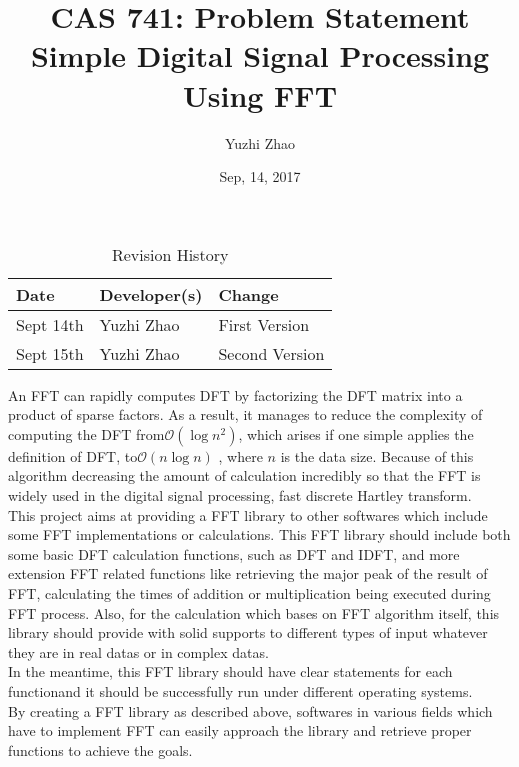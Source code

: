 \documentclass{article}
\title{CAS 741: Problem Statement\\Simple Digital Signal Processing Using FFT }
\author{Yuzhi Zhao}
\date{Sep, 14, 2017}
\begin{document}
\maketitle

\begin{table}[hp]
\caption{Revision History} \label{TblRevisionHistory}
\begin{tabularx}{\textwidth}{llX}
\toprule
\textbf{Date} & \textbf{Developer(s)} & \textbf{Change}\\
\midrule
Sept 14th & Yuzhi Zhao & First Version\\
Sept 15th & Yuzhi Zhao & Second Version\\

\bottomrule
\end{tabularx}
\end{table}

An FFT can rapidly computes DFT by factorizing the DFT matrix into a product of
sparse factors. As a result, it manages to reduce the complexity of computing
the DFT from$\mathcal{O}(\log{}n^2)$, which arises if one simple applies the
definition of
DFT, to$\mathcal{O}(n\log{}n)$ , where $\mathcal{}n$ is the data size. Because
of this
algorithm decreasing the amount of calculation incredibly so that the FFT is
widely used in the digital signal processing, fast discrete Hartley
transform.\\

This project aims at providing a FFT library to other softwares
which include
some FFT implementations or calculations. This FFT library should include both
some basic DFT calculation functions, such as DFT and IDFT, and more extension
FFT related functions like retrieving the major peak of the result of FFT,
calculating the times of addition or multiplication being executed during FFT
process. Also, for the calculation which bases on FFT algorithm itself, this
library should provide with solid supports to different types of input whatever
they are in real datas or in complex datas.\\

In the meantime, this FFT library should have clear statements for each
functionand it should be successfully run under different operating systems.\\

By creating a FFT library as described above, softwares in various fields which
have to implement FFT can easily approach the library and retrieve proper
functions to achieve the goals.
\end{document}
